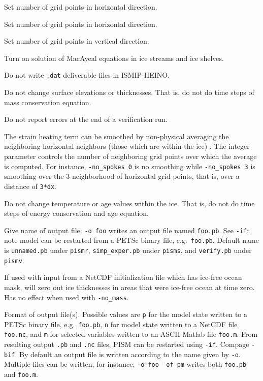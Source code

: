 \documentclass[11pt,final]{amsart}
\begin{document}
  Set number of grid points in horizontal direction.

  Set number of grid points in horizontal direction.

  Set number of grid points in vertical direction.


 Turn on solution of MacAyeal equations \cite{MacAyeal} in ice streams and ice shelves.
 
 
 
  Do not write \verb|.dat| deliverable files in ISMIP-HEINO.

  Do not change surface elevations or thicknesses.  That is, do not do time steps of mass conservation equation.

  Do not report errors at the end of a verification run.

  The strain heating term can be smoothed by non-physical averaging the neighboring horizontal neighbors (those which are within the ice) \cite{BBL}.  The integer parameter controls the number of neighboring grid points over which the average is computed.  For instance, \verb|-no_spokes 0| is no smoothing while \verb|-no_spokes 3| is smoothing over the 3-neighborhood of horizontal grid points, that is, over a distance of \verb|3*dx|.

  Do not change temperature or age values within the ice.  That is, do not do time steps of energy conservation and age equation.

 Give name of output file: \verb|-o foo| writes an output file named \verb|foo.pb|.  See \verb|-if|; note model can be restarted from a PETSc binary file, e.g.~\verb|foo.pb|.  Default name is \verb|unnamed.pb| under \verb|pismr|, \verb|simp_exper.pb| under \verb|pisms|, and \verb|verify.pb| under \verb|pismv|.

  If used with input from a NetCDF initialization file which has ice-free ocean mask, will zero out ice thicknesses in areas that were ice-free ocean at time zero.  Has no effect when used with \verb|-no_mass|.

  Format of output file(s).  Possible values are \verb|p| for the model state written to a PETSc binary file, e.g.~\verb|foo.pb|, \verb|n| for model state written to a NetCDF file \verb|foo.nc|, and \verb|m| for selected variables written to an ASCII Matlab file \verb|foo.m|.  From resulting output \verb|.pb| and \verb|.nc| files, PISM can be restarted using \verb|-if|.  Compage \verb|-bif|.  By default an output file is written according to the name given by \verb|-o|.  Multiple files can be written, for instance, \verb|-o foo -of pm| writes both \verb|foo.pb| and \verb|foo.m|.
\end{document}
